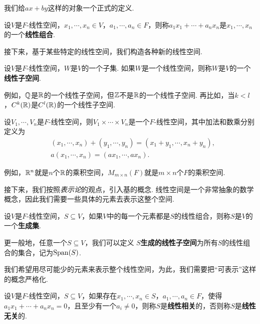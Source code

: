 我们给$ax+by$这样的对象一个正式的定义. 

\begin{definition}[线性组合]
设$V$是$F$-线性空间，$x_1,\cdots,x_n\in V$，$a_1,\cdots,a_n\in F$，则称$a_1x_1+\cdots+a_nx_n$是$x_1,\cdots,x_n$的一个\textbf{线性组合}. 
\end{definition}

接下来，基于某些特定的线性空间，我们构造各种新的线性空间. 

\begin{definition}[线性子空间]
设$V$是$F$-线性空间，$W$是$V$的一个子集. 如果$W$是一个线性空间，则称$W$是$V$的一个\textbf{线性子空间}. 
\end{definition}

例如，$\mathbb{Q}$是$\mathbb{R}$的一个线性子空间，但$\mathbb{Z}$不是$\mathbb{R}$的一个线性子空间. 再比如，当$k<l$，$C^k(\mathbb{R})$是$C^l(\mathbb{R})$的一个线性子空间. 

\begin{definition}[乘积空间]
设$V_1,\cdots,V_n$是$F$-线性空间，则$V_1\times\cdots\times V_n$是一个$F$-线性空间，其中加法和数乘分别定义为
\begin{align*}
    &(x_1,\cdots,x_n)+(y_1,\cdots,y_n)=(x_1+y_1,\cdots,x_n+y_n),\\
    &a(x_1,\cdots,x_n)=(ax_1,\cdots,ax_n).
\end{align*}
\end{definition}

例如，$\mathbb{R}^n$就是$n$个$\mathbb{R}$的乘积空间，$M_{m\times n}(F)$就是$m\times n$个$F$的乘积空间. 

接下来，我们按照\emph{表示论}的观点，引入基的概念. 线性空间是一个非常抽象的数学概念，因此我们需要一些具体的元素去表示这整个空间. 

\begin{definition}[生成集]
设$V$是$F$-线性空间，$S\subseteq V$，如果$V$中的每一个元素都是$S$的线性组合，则称$S$是$V$的一个\textbf{生成集}. 

更一般地，任意一个$S\subseteq V$，我们可以定义 \textbf{$S$生成的线性子空间}为所有$S$的线性组合的集合，记为$\operatorname*{Span}(S)$. 
\end{definition}

我们希望用尽可能少的元素来表示整个线性空间，为此，我们需要把“可表示”这样的概念严格化. 

\begin{definition}[线性相关]
设$V$是$F$-线性空间，$S\subseteq V$，如果存在$x_1,\cdots,x_n\in S$，$a_1,\cdots,a_n\in F$，使得$a_1x_1+\cdots+a_nx_n=0$，且至少有一个$a_i\neq 0$，则称$S$是\textbf{线性相关}的，否则称$S$是\textbf{线性无关}的. 
\end{definition}

